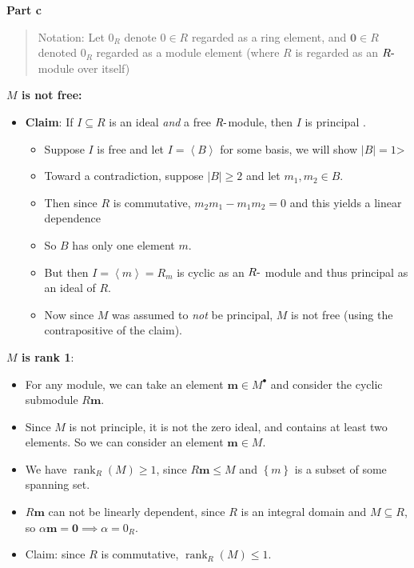 \begin{solution}
\textbf{Part c}

\begin{quote}
Notation: Let \(0_R\) denote \(0\in R\) regarded as a ring element, and
\(\mathbf{0} \in R\) denoted \(0_R\) regarded as a module element (where
\(R\) is regarded as an \(R{\hbox{-}}\)module over itself)
\end{quote}

\textbf{\(M\) is not free:}

\begin{itemize}
\item
  \textbf{Claim}: If \(I\subseteq R\) is an ideal \emph{and} a free
  \(R{\hbox{-}}\)module, then \(I\) is principal .

  \begin{itemize}
  \item
    Suppose \(I\) is free and let \(I = \left\langle{B}\right\rangle\)
    for some basis, we will show
    \({\left\lvert {B} \right\rvert} = 1\)\textgreater{}
  \item
    Toward a contradiction, suppose
    \({\left\lvert {B} \right\rvert} \geq 2\) and let \(m_1, m_2\in B\).
  \item
    Then since \(R\) is commutative, \(m_2 m_1 - m_1 m_2 = 0\) and this
    yields a linear dependence
  \item
    So \(B\) has only one element \(m\).
  \item
    But then \(I = \left\langle{m}\right\rangle = R_m\) is cyclic as an
    \(R{\hbox{-}}\) module and thus principal as an ideal of \(R\).
  \item
    Now since \(M\) was assumed to \emph{not} be principal, \(M\) is not
    free (using the contrapositive of the claim).
  \end{itemize}
\end{itemize}

\textbf{\(M\) is rank 1}:

\begin{itemize}
\item
  For any module, we can take an element \(\mathbf{m}\in M^{\bullet}\)
  and consider the cyclic submodule \(R\mathbf{m}\).
\item
  Since \(M\) is not principle, it is not the zero ideal, and contains
  at least two elements. So we can consider an element
  \(\mathbf{m}\in M\).
\item
  We have \(\operatorname{rank}_R(M) \geq 1\), since
  \(R\mathbf{m} \leq M\) and \(\left\{{m}\right\}\) is a subset of some
  spanning set.
\item
  \(R\mathbf{m}\) can not be linearly dependent, since \(R\) is an
  integral domain and \(M\subseteq R\), so
  \(\alpha \mathbf{m} = \mathbf{0} \implies \alpha = 0_R\).
\item
  Claim: since \(R\) is commutative,
  \(\operatorname{rank}_R(M) \leq 1\).


\end{itemize}
\end{solution}
